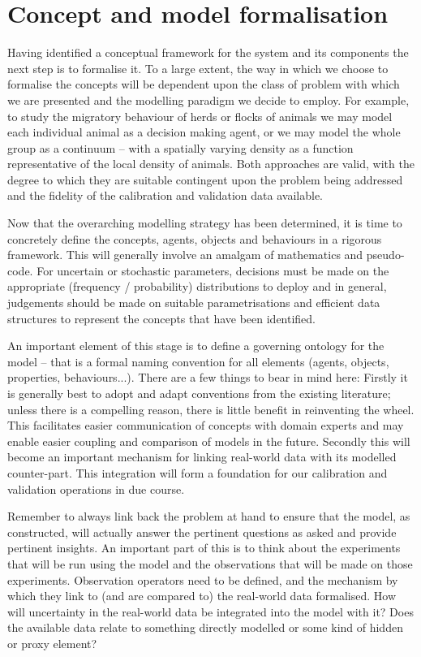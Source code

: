 \section{Concept and model formalisation}

Having identified a conceptual framework for the system and its components the
next step is to formalise it. To a large extent, the way in which we choose to
formalise the concepts will be dependent upon the class of problem with which
we are presented and the modelling paradigm we decide to employ. For example,
to study the migratory behaviour of herds or flocks of animals we may model
each individual animal as a decision making agent, or we may model the whole
group as a continuum -- with a spatially varying density as a function
representative of the local density of animals. Both approaches are valid, with
the degree to which they are suitable contingent upon the problem being
addressed and the fidelity of the calibration and validation data available.

Now that the overarching modelling strategy has been  determined, it is time to
concretely define the concepts, agents, objects and behaviours in a rigorous
framework.  This will generally involve an amalgam of mathematics and
pseudo-code. For uncertain or stochastic parameters, decisions must be made on
the appropriate (frequency / probability) distributions to deploy and in
general, judgements should be made on suitable parametrisations and efficient
data structures to represent the concepts that have been identified.

An important element of this stage is to define a governing ontology for the
model -- that is a formal naming convention for all elements (agents, objects,
properties, behaviours...). There are a few things to bear in mind here:
Firstly it is generally best to adopt and adapt conventions from the existing
literature; unless there is a compelling reason, there is little benefit in
reinventing the wheel. This facilitates easier communication of concepts with
domain experts and may enable easier coupling and comparison of models in the
future. Secondly this will become an important mechanism for linking real-world
data with its modelled counter-part. This integration will form a foundation
for our calibration and validation operations in due course.

Remember to always link back the problem at hand to ensure that the model, as 
constructed, will actually answer the pertinent questions as asked and provide 
pertinent insights. An important part of this is to think about the experiments
that will be run using the model and the observations that will be made on those
experiments. Observation operators need to be defined, and the mechanism by
which they link to (and are compared to) the real-world data formalised. How
will uncertainty in the real-world data be integrated into the model with it? Does
the available data relate to something directly modelled or some kind of hidden or 
proxy element?

